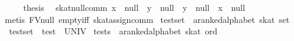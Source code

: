\begin{isabellebody}
\ \ \isamarkupfalse%
\ \isamarkupfalse%
\ {}thesis\ \isamarkupfalse%
\isanewline
{}\isamarkupfalse%
%
\endisatagproof
{\isafoldproof}%
%
\isadelimproof
\isanewline
%
\endisadelimproof
\isanewline
{}\isamarkupfalse%
\ skat{}null{}comm{}\ {}{}x\ {}{}\ null\ {}\ y\ {}{}\ null{}\ {}\ {}y\ {}{}\ null\ {}\ x\ {}{}\ null{}{}\isanewline
%
\isadelimproof
\ \ %
\endisadelimproof
%
\isatagproof
{}\isamarkupfalse%
\ {}metis\ FV{}null\ empty{}iff\ skat{}assign{}comm{}%
\endisatagproof
{\isafoldproof}%
%
\isadelimproof
%
\endisadelimproof
%
\isamarkuptrue%
\isamarkupfalse%
\ test{}set\ {}{}\ {}{}a{}{}ranked{}alphabet\ skat\ set{}\ \isanewline
\ \ {}test{}set\ {}\ test\ {}\ UNIV{}\isanewline
\isanewline
{}\isamarkupfalse%
\ tests\ {}{}\ {}{}a{}{}ranked{}alphabet\ skat\ ord{}\ \isanewline

\end{isabellebody}

